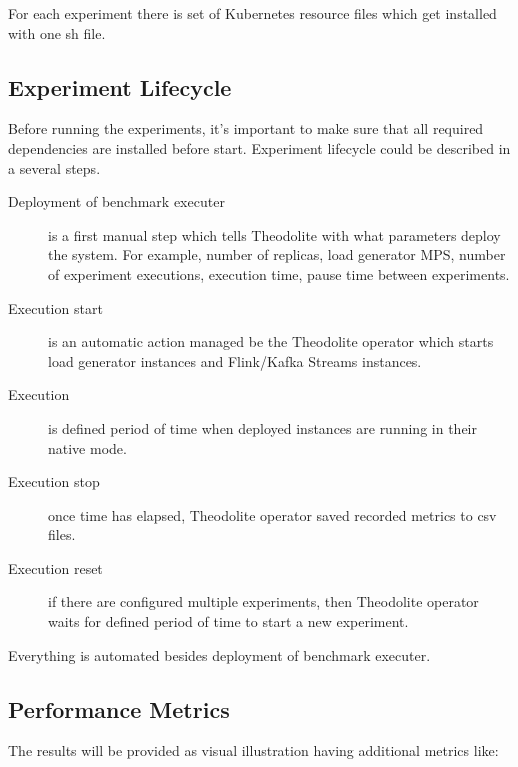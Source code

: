 For each experiment there is set of Kubernetes resource files which get installed
with one sh file.

\subsection{Experiment Lifecycle}\label{subsec:experiment-lifecycle}
Before running the experiments, it's important to make sure that all required
dependencies are installed before start.
Experiment lifecycle could be described in a several steps.

\begin{description}
    \item[Deployment of benchmark executer] is a first manual step which tells Theodolite
    with what parameters deploy the system.
    For example, number of replicas, load generator MPS, number of experiment executions,
    execution time, pause time between experiments.
    \item[Execution start] is an automatic action managed be the Theodolite operator which starts
    load generator instances and Flink/Kafka Streams instances.
    \item[Execution] is defined period of time when deployed instances are running in their
    native mode.
    \item[Execution stop] once time has elapsed, Theodolite operator saved recorded metrics to csv files.
    \item[Execution reset] if there are configured multiple experiments, then
    Theodolite operator waits for defined period of time to start a new experiment.
\end{description}

Everything is automated besides deployment of benchmark executer.

\subsection{Performance Metrics}\label{subsec:performance-metrics}

The results will be provided as visual illustration having additional metrics like:


